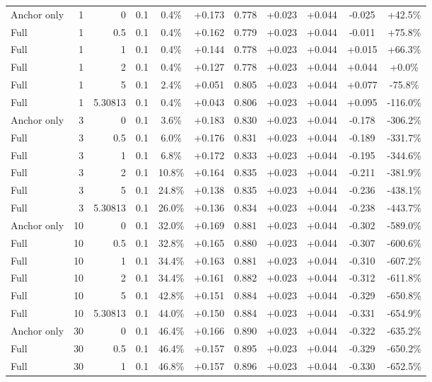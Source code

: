 \begin{table}[htbp]
\begin{tabular}{lrrrccccccc}
Anchor only & 1 & 0 & 0.1 & 0.4\% & +0.173 & 0.778 & +0.023 & +0.044 & -0.025 & +42.5\% \\
Full & 1 & 0.5 & 0.1 & 0.4\% & +0.162 & 0.779 & +0.023 & +0.044 & -0.011 & +75.8\% \\
Full & 1 & 1 & 0.1 & 0.4\% & +0.144 & 0.778 & +0.023 & +0.044 & +0.015 & +66.3\% \\
Full & 1 & 2 & 0.1 & 0.4\% & +0.127 & 0.778 & +0.023 & +0.044 & +0.044 & +0.0\% \\
Full & 1 & 5 & 0.1 & 2.4\% & +0.051 & 0.805 & +0.023 & +0.044 & +0.077 & -75.8\% \\
Full & 1 & 5.30813 & 0.1 & 0.4\% & +0.043 & 0.806 & +0.023 & +0.044 & +0.095 & -116.0\% \\
Anchor only & 3 & 0 & 0.1 & 3.6\% & +0.183 & 0.830 & +0.023 & +0.044 & -0.178 & -306.2\% \\
Full & 3 & 0.5 & 0.1 & 6.0\% & +0.176 & 0.831 & +0.023 & +0.044 & -0.189 & -331.7\% \\
Full & 3 & 1 & 0.1 & 6.8\% & +0.172 & 0.833 & +0.023 & +0.044 & -0.195 & -344.6\% \\
Full & 3 & 2 & 0.1 & 10.8\% & +0.164 & 0.835 & +0.023 & +0.044 & -0.211 & -381.9\% \\
Full & 3 & 5 & 0.1 & 24.8\% & +0.138 & 0.835 & +0.023 & +0.044 & -0.236 & -438.1\% \\
Full & 3 & 5.30813 & 0.1 & 26.0\% & +0.136 & 0.834 & +0.023 & +0.044 & -0.238 & -443.7\% \\
Anchor only & 10 & 0 & 0.1 & 32.0\% & +0.169 & 0.881 & +0.023 & +0.044 & -0.302 & -589.0\% \\
Full & 10 & 0.5 & 0.1 & 32.8\% & +0.165 & 0.880 & +0.023 & +0.044 & -0.307 & -600.6\% \\
Full & 10 & 1 & 0.1 & 34.4\% & +0.163 & 0.881 & +0.023 & +0.044 & -0.310 & -607.2\% \\
Full & 10 & 2 & 0.1 & 34.4\% & +0.161 & 0.882 & +0.023 & +0.044 & -0.312 & -611.8\% \\
Full & 10 & 5 & 0.1 & 42.8\% & +0.151 & 0.884 & +0.023 & +0.044 & -0.329 & -650.8\% \\
Full & 10 & 5.30813 & 0.1 & 44.0\% & +0.150 & 0.884 & +0.023 & +0.044 & -0.331 & -654.9\% \\
Anchor only & 30 & 0 & 0.1 & 46.4\% & +0.166 & 0.890 & +0.023 & +0.044 & -0.322 & -635.2\% \\
Full & 30 & 0.5 & 0.1 & 46.4\% & +0.157 & 0.895 & +0.023 & +0.044 & -0.329 & -650.2\% \\
Full & 30 & 1 & 0.1 & 46.8\% & +0.157 & 0.896 & +0.023 & +0.044 & -0.330 & -652.5\% \\

\end{tabular}
\end{table}
